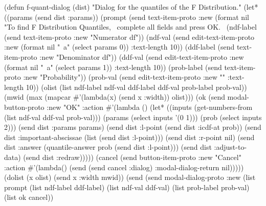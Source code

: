 \nwenddocs{}\endmoddef
(defun f-quant-dialog (dist)
  "Dialog for the quantiles of the F Distribution."
  (let* ((params (send dist :params))
         (prompt (send text-item-proto :new
                  (format nil 
                    "To find F Distribution Quantiles,~%
                     complete all fields and press OK.~%
         (ndf-label (send text-item-proto :new "Numerator df"))
         (ndf-val (send edit-text-item-proto :new
                         (format nil "~a" (select params 0)) :text-length 10))
         (ddf-label (send text-item-proto :new "Denominator df"))
         (ddf-val (send edit-text-item-proto :new
                       (format nil "~a" (select params 1)) :text-length 10))
         (prob-label (send text-item-proto :new "Probability"))
         (prob-val (send edit-text-item-proto :new "" :text-length 10))
         (olist (list ndf-label ndf-val ddf-label ddf-val
                      prob-label prob-val))
         (mwid (max (mapcar #'(lambda(x) (send x :width)) olist)))
         (ok (send modal-button-proto :new "OK"
                   :action
                   #'(lambda ()
                      (let* ((inputs (get-numbers-from 
                                      (list ndf-val ddf-val prob-val)))
                             (params (select inputs '(0 1)))
                             (prob (select inputs 2)))
                         (send dist :params params)
                         (send dist :l-point (send dist :icdf-at prob))
                         (send dist :important-abscissae 
                               (list (send dist :l-point)))
                         (send dist :r-point nil)
                         (send dist :answer
                              (quantile-answer prob (send dist :l-point)))
                         (send dist :adjust-to-data)
                         (send dist :redraw)))))
         (cancel (send button-item-proto :new "Cancel"
                       :action
                       #'(lambda()
                           (send (send cancel :dialog)
                                 :modal-dialog-return nil)))))
    (dolist (x olist)
            (send x :width mwid))
    (send (send modal-dialog-proto
                :new (list prompt
                           (list ndf-label ddf-label)
                           (list ndf-val ddf-val)
                           (list prob-label prob-val)
                           (list ok cancel))
